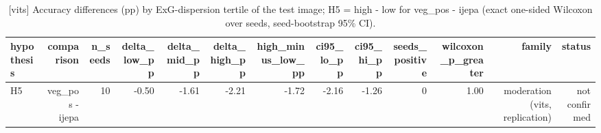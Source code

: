\begin{table}[t]
\centering
\small
\caption{[vits] Accuracy differences (pp) by ExG-dispersion tertile of the test image; H5 = high - low for veg\_pos - ijepa (exact one-sided Wilcoxon over seeds, seed-bootstrap 95\% CI).}
\label{tab:moderation}
\begin{tabular}{lrrrrrrrrrrrr}
\toprule
hypothesis & comparison & n\_seeds & delta\_low\_pp & delta\_mid\_pp & delta\_high\_pp & high\_minus\_low\_pp & ci95\_lo\_pp & ci95\_hi\_pp & seeds\_positive & wilcoxon\_p\_greater & family & status \\
\midrule
H5 & veg\_pos - ijepa & 10 & -0.50 & -1.61 & -2.21 & -1.72 & -2.16 & -1.26 & 0 & 1.00 & moderation (vits, replication) & not confirmed \\
\bottomrule
\end{tabular}
\end{table}
